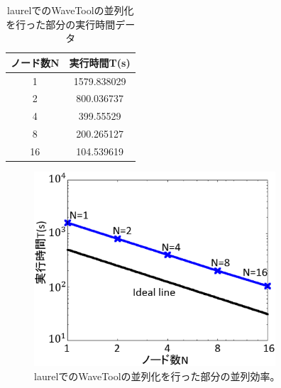 \documentclass{jsarticle}
\begin{document}
\begin{table}[H]
  \centering
  \caption{laurelでのWaveToolの並列化を行った部分の実行時間データ}
  \label{table:pi-02}

  \begin{tabular}{|c|c|} \hline
   ノード数N & 実行時間T(s) \\ \hline
   1 & 1579.838029 \\ \hline
   2 & 800.036737 \\ \hline
   4 & 399.55529 \\ \hline
   8 & 200.265127 \\ \hline
  16 & 104.539619 \\ \hline
  \end{tabular}
\end{table}

\begin{figure}[H]
\centering
\includegraphics[width=9cm,clip]{fig/laurel_WaveTool.eps}
\caption{laurelでのWaveToolの並列化を行った部分の並列効率。}
\label{fig:pi-01}
\end{figure}
\end{document}

